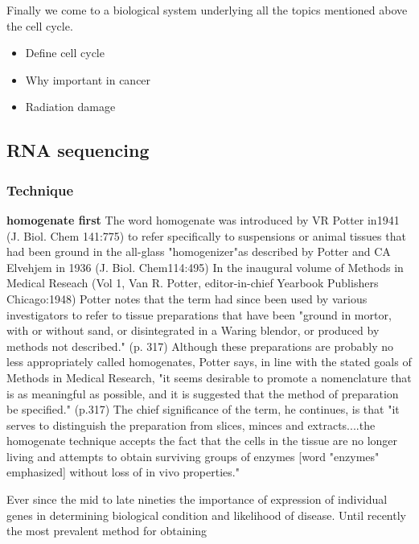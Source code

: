 Finally we come to a biological system underlying all the topics mentioned above the cell cycle.

\begin{itemize}
\item Define cell cycle
\item Why important in cancer
\item Radiation damage
\end{itemize}

\subsection{RNA sequencing}
\label{sec:rna-sequencing}

\subsubsection{Technique}
\label{sec:technique-bio}

{\bf homogenate first} The word homogenate was introduced by VR Potter in1941 (J. Biol. Chem 141:775) to refer specifically to suspensions or animal tissues that had been ground in the all-glass "homogenizer"as described by Potter and CA Elvehjem in 1936 (J. Biol. Chem114:495) In the inaugural volume of Methods in Medical Reseach (Vol 1, Van R. Potter, editor-in-chief Yearbook Publishers Chicago:1948) Potter notes that the term had since been used by various investigators to refer to tissue preparations that have been "ground in mortor, with or without sand, or disintegrated in a Waring blendor, or produced by methods not described." (p. 317) Although these preparations are probably no less appropriately called homogenates, Potter says, in line with the stated goals of Methods in Medical Research, "it seems desirable to promote a nomenclature that is as meaningful as possible, and it is suggested that the method of preparation be specified." (p.317) The chief significance of the term, he continues, is that "it serves to distinguish the preparation from slices, minces and extracts....the homogenate technique accepts the fact that the cells in the tissue are no longer living and attempts to obtain surviving groups of enzymes [word "enzymes" emphasized] without loss of in vivo properties."

Ever since the mid to late nineties the importance of expression of individual genes in determining biological condition
and {\color{red} likelihood of} disease. Until recently the most prevalent method for obtaining 


